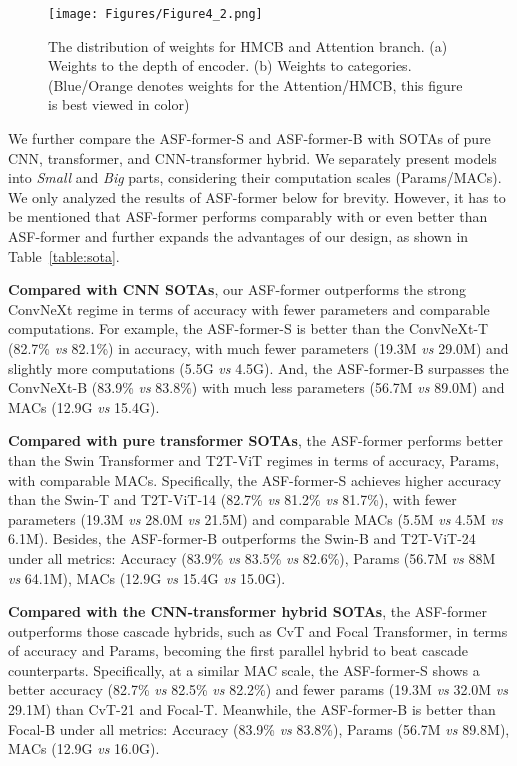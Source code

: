 \documentclass[lettersize,journal]{IEEEtran}
\begin{document}
\begin{figure*}
\centering
\texttt{[image: Figures/Figure4\_2.png]}
\caption{The distribution of weights for HMCB and Attention branch. (a) Weights to the depth of encoder. (b) Weights to categories. (Blue/Orange denotes weights for the Attention/HMCB, this figure is best viewed in color)}
\label{fig:vis}
\end{figure*}

We further compare the ASF-former-S and ASF-former-B with SOTAs of pure CNN, transformer, and CNN-transformer hybrid. We separately present models into \textit{Small} and \textit{Big} parts, considering their computation scales (Params/MACs). We only analyzed the results of ASF-former below for brevity. However, it has to be mentioned that ASF-former performs comparably with or even better than ASF-former and further expands the advantages of our design, as shown in Table~\ref{table:sota}.

\textbf{Compared with CNN SOTAs}, our ASF-former outperforms the strong ConvNeXt regime in terms of accuracy with fewer parameters and comparable computations. For example, the {ASF-former-S} is better than the ConvNeXt-T ({82.7}\% \textit{vs} 82.1\%) in accuracy, with much fewer parameters ({19.3}M \textit{vs} 29.0M) and slightly more computations ({5.5}G \textit{vs} 4.5G). And, the {ASF-former-B} surpasses the ConvNeXt-B ({83.9}\% \textit{vs} 83.8\%) with much less parameters ({56.7}M \textit{vs} 89.0M) and MACs ({12.9}G \textit{vs} 15.4G). 

\textbf{Compared with pure transformer SOTAs}, the ASF-former performs better than the Swin Transformer and T2T-ViT regimes in terms of accuracy, Params, with comparable MACs. Specifically, the ASF-former-S achieves higher accuracy than the Swin-T and  T2T-ViT-14 (82.7\% \textit{vs} 81.2\% \textit{vs} 81.7\%), with fewer parameters (19.3M \textit{vs} 28.0M \textit{vs} 21.5M) and comparable MACs (5.5M \textit{vs} 4.5M \textit{vs} 6.1M). Besides, the ASF-former-B outperforms the Swin-B and T2T-ViT-24 under all metrics: Accuracy (83.9\% \textit{vs} 83.5\% \textit{vs} 82.6\%), Params (56.7M \textit{vs} 88M \textit{vs} 64.1M), MACs (12.9G \textit{vs} 15.4G \textit{vs} 15.0G).

\textbf{Compared with the CNN-transformer hybrid SOTAs}, the ASF-former outperforms those cascade hybrids, such as CvT and Focal Transformer, in terms of accuracy and Params, becoming the first parallel hybrid to beat cascade counterparts. Specifically, at a similar MAC scale, the ASF-former-S shows a better accuracy (82.7\% \textit{vs} 82.5\% \textit{vs} 82.2\%) and fewer params (19.3M \textit{vs} 32.0M \textit{vs} 29.1M) than CvT-21 and Focal-T. Meanwhile, the ASF-former-B is better than Focal-B under all metrics: Accuracy (83.9\% \textit{vs} 83.8\%), Params (56.7M \textit{vs} 89.8M), MACs (12.9G \textit{vs} 16.0G).
\end{document}
